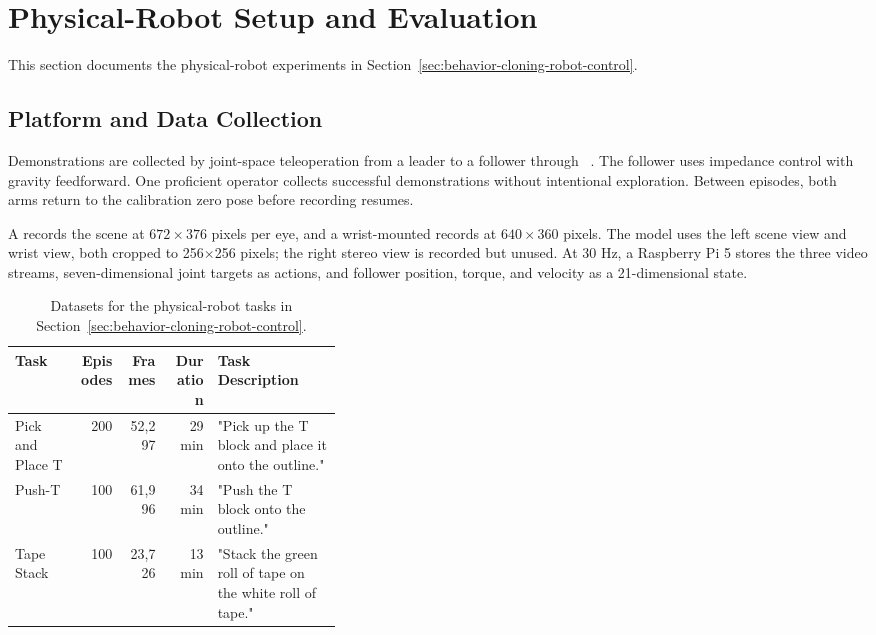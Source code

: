 \section{Physical-Robot Setup and Evaluation}
\label{app:real-robot}

This section documents the physical-robot experiments in Section~\ref{sec:behavior-cloning-robot-control}.

\subsection{Platform and Data Collection}
\label{app:robot-data}

Demonstrations are collected by joint-space teleoperation from a
 leader to a  follower through
~\citep{cadene2026lerobot}. The follower uses impedance control
with gravity feedforward. One proficient operator collects successful demonstrations
without intentional exploration. Between episodes, both arms return to the calibration
zero pose before recording resumes.

A  records the scene at $672\times376$ pixels per eye, and a
wrist-mounted  records at $640\times360$ pixels. The model
uses the left scene view and wrist view, both cropped to 256$\times$256 pixels; the right stereo view is recorded but unused.
At 30 Hz, a Raspberry Pi 5 stores the three video streams, seven-dimensional joint
targets as actions, and follower position, torque, and velocity as a 21-dimensional state.

\begin{table}[H]
\centering
\small
\caption{Datasets for the physical-robot tasks in Section~\ref{sec:behavior-cloning-robot-control}.}
\label{tab:robot-current-datasets}
\label{tab:robot-datasets}
\begin{tabular}{@{}lrrr>{\raggedright\arraybackslash}p{0.38\linewidth}@{}}
\toprule
Task & Episodes & Frames & Duration & Task Description \\
\midrule
Pick and Place T & 200 & 52,297 & 29 min & "Pick up the T block and place it onto the outline." \\
Push-T & 100 & 61,996 & 34 min & "Push the T block onto the outline." \\
Tape Stack & 100 & 23,726 & 13 min & "Stack the green roll of tape on the white roll of tape." \\
\bottomrule
\end{tabular}
\end{table}

